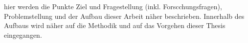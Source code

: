 hier werden die Punkte Ziel und Fragestellung (inkl. Forscchungsfragen), Problemstellung und der Aufbau dieser Arbeit näher beschrieben. Innerhalb des Aufbaus wird näher auf die Methodik und auf das Vorgehen dieser Thesis eingegangen.
